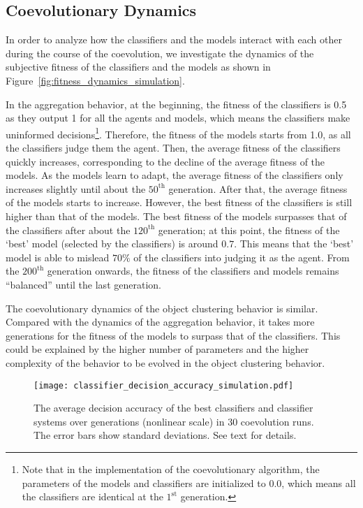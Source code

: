 \subsection{Coevolutionary Dynamics}\label{sec:coevolutionary_dynamics_simulation_swarm_simulation}
In order to analyze how the classifiers and the models interact with each other during the course of the coevolution, we investigate the dynamics of the subjective fitness of the classifiers and the models as shown in Figure~\ref{fig:fitness_dynamics_simulation}. 

In the aggregation behavior, at the beginning, the fitness of the classifiers is 0.5 as they output 1 for all the agents and models, which means the classifiers make uninformed decisions\footnote{Note that in the implementation of the coevolutionary algorithm, the parameters of the models and classifiers are initialized to $0.0$, which means all the classifiers are identical at the $1^{\mathrm{st}}$ generation.}. Therefore, the fitness of the models starts from 1.0, as all the classifiers judge them the agent. Then, the average fitness of the classifiers quickly increases, corresponding to the decline of the average fitness of the models. As the models learn to adapt, the average fitness of the classifiers only increases slightly until about the $50^{\mathrm{th}}$ generation. After that, the average fitness of the models starts to increase. However, the best fitness of the classifiers is still higher than that of the models. The best fitness of the models surpasses that of the classifiers after about the $120^{\mathrm{th}}$ generation; at this point, the fitness of the `best' model (selected by the classifiers) is around $0.7$. This means that the `best' model is able to mislead $70\%$ of the classifiers into judging it as the agent. From the $200^{\mathrm{th}}$ generation onwards, the fitness of the classifiers and models remains ``balanced'' until the last generation. 

The coevolutionary dynamics of the object clustering behavior is similar. Compared with the dynamics of the aggregation behavior, it takes more generations for the fitness of the models to surpass that of the classifiers. This could be explained by the higher number of parameters and the higher complexity of the behavior to be evolved in the object clustering behavior.

\begin{figure}[!t]
	\centering
	\texttt{[image: classifier\_decision\_accuracy\_simulation.pdf]}
	\caption{The average decision accuracy of the best classifiers and classifier systems over generations (nonlinear scale) in $30$ coevolution runs. The error bars show standard deviations. See text for details.}
	\label{fig:classifier_decision_accuracy_swarm_simulation}
\end{figure}

